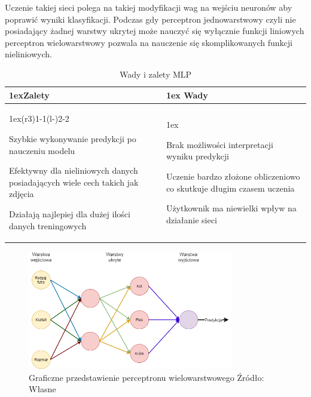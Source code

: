 Uczenie takiej sieci polega na takiej modyfikacji wag na wejściu neuronów aby poprawić
wyniki klasyfikacji. Podczas gdy perceptron jednowarstwowy czyli nie posiadający żadnej warstwy ukrytej może 
nauczyć się wyłącznie funkcji liniowych perceptron wielowarstwowy pozwala na nauczenie
się skomplikowanych funkcji nieliniowych.

\begin{table}[h]
    \begin{tabularx}{\linewidth}{>{\parskip1ex}X@{\kern4\tabcolsep}>{\parskip1ex}X}
    \toprule
    \hfil\bfseries Zalety
    &
    \hfil\bfseries Wady
    \\\cmidrule(r{3\tabcolsep}){1-1}\cmidrule(l{-\tabcolsep}){2-2}
    
    Szybkie wykonywanie predykcji po nauczeniu modelu\par
    Efektywny dla nieliniowych danych posiadających wiele cech takich jak zdjęcia\par
    Działają najlepiej dla dużej ilości danych treningowych\par
    &
    
    Brak możliwości interpretacji wyniku predykcji\par
    Uczenie bardzo złożone obliczeniowo co skutkuje długim czasem uczenia\par
    Użytkownik ma niewielki wpływ na działanie sieci\par
    \\\bottomrule
    \end{tabularx}
    \caption{Wady i zalety MLP}
\end{table}

\begin{figure}[h]
    \centering
    \includegraphics[width=0.8\textwidth]{./Img/MLP.png}
    \caption{Graficzne przedstawienie perceptronu wielowarstwowego Źródło: Własne}
\end{figure}

